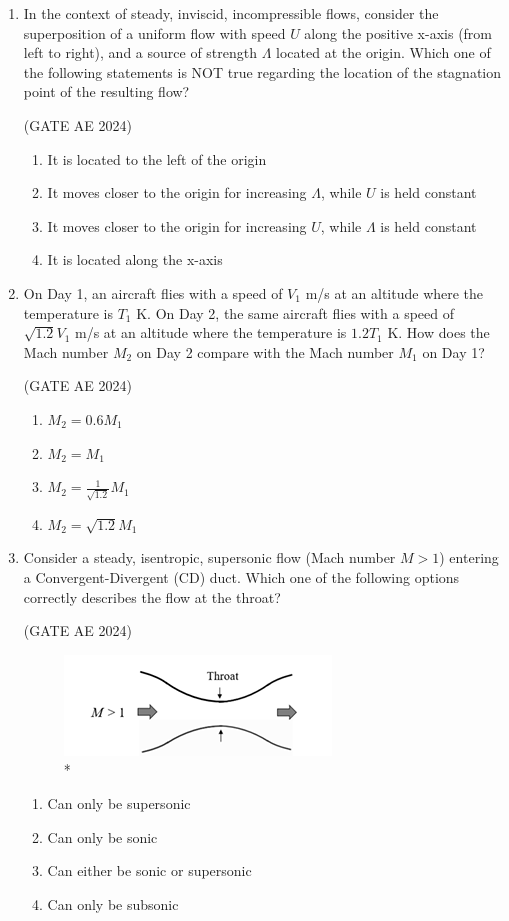 \documentclass[journal,12pt,onecolumn]{IEEEtran}
\theoremstyle{remark}
\begin{document}
\begin{flushleft}
\begin{enumerate}
\item In the context of steady, inviscid, incompressible flows, consider the superposition of a uniform flow with speed $U$ along the positive x-axis (from left to right), and a source of strength $\Lambda$ located at the origin. Which one of the following statements is NOT true regarding the location of the stagnation point of the resulting flow?

\hfill (GATE AE 2024)

\begin{enumerate}
     \item It is located to the left of the origin
    \item It moves closer to the origin for increasing $\Lambda$, while $U$ is held constant
    \item It moves closer to the origin for increasing $U$, while $\Lambda$ is held constant
    \item It is located along the x-axis
\end{enumerate}

\item  On Day 1, an aircraft flies with a speed of $V_1$ m/s at an altitude where the temperature is $T_1$ K. On Day 2, the same aircraft flies with a speed of $\sqrt{1.2}V_1$ m/s at an altitude where the temperature is $1.2T_1$ K. How does the Mach number $M_2$ on Day 2 compare with the Mach number $M_1$ on Day 1?

\hfill (GATE AE 2024)

\begin{enumerate}
    \item $M_2 = 0.6 M_1$
    \item $M_2 = M_1$
    \item $M_2 = \frac{1}{\sqrt{1.2}} M_1$
    \item $M_2 = \sqrt{1.2} M_1$
\end{enumerate}
    
\item Consider a steady, isentropic, supersonic flow (Mach number $M > 1$) entering a Convergent-Divergent (CD) duct. Which one of the following options correctly describes the flow at the throat?

\hfill (GATE AE 2024)

\begin{figure}[H]
\includegraphics[width=0.5\columnwidth]{figs/throat.png}
\caption{*}
    \label{fig:placeholder}
\end{figure}
\begin{enumerate}
    \item Can only be supersonic
    \item Can only be sonic
    \item Can either be sonic or supersonic
    \item Can only be subsonic
\end{enumerate}


\end{enumerate}
\end{flushleft}
\end{document}
